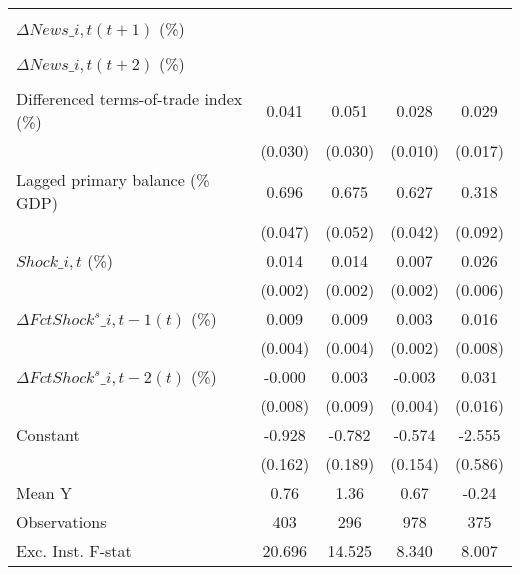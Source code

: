 {\begin{tabular}{l*{4}{c}}
                    &                     &                     &                     &                     \\
\addlinespace
$ \Delta News\_{i,t}(t+1)$ (\%)&                     &                     &                     &                     \\
                    &                     &                     &                     &                     \\
\addlinespace
$ \Delta News\_{i,t}(t+2)$ (\%)&                     &                     &                     &                     \\
                    &                     &                     &                     &                     \\
\addlinespace
Differenced terms-of-trade index (\%)&       0.041         &       0.051         &       0.028\sym{***}&       0.029\sym{*}  \\
                    &     (0.030)         &     (0.030)         &     (0.010)         &     (0.017)         \\
\addlinespace
Lagged primary balance (\% GDP)&       0.696\sym{***}&       0.675\sym{***}&       0.627\sym{***}&       0.318\sym{***}\\
                    &     (0.047)         &     (0.052)         &     (0.042)         &     (0.092)         \\
\addlinespace
$ Shock\_{i,t}$ (\%) &       0.014\sym{***}&       0.014\sym{***}&       0.007\sym{***}&       0.026\sym{***}\\
                    &     (0.002)         &     (0.002)         &     (0.002)         &     (0.006)         \\
\addlinespace
$ \Delta FctShock^s\_{i,t-1}(t)$ (\%)&       0.009\sym{**} &       0.009\sym{*}  &       0.003         &       0.016\sym{**} \\
                    &     (0.004)         &     (0.004)         &     (0.002)         &     (0.008)         \\
\addlinespace
$ \Delta FctShock^s\_{i,t-2}(t)$ (\%)&      -0.000         &       0.003         &      -0.003         &       0.031\sym{*}  \\
                    &     (0.008)         &     (0.009)         &     (0.004)         &     (0.016)         \\
\addlinespace
Constant            &      -0.928\sym{***}&      -0.782\sym{***}&      -0.574\sym{***}&      -2.555\sym{***}\\
                    &     (0.162)         &     (0.189)         &     (0.154)         &     (0.586)         \\
\midrule
Mean Y              &        0.76         &        1.36         &        0.67         &       -0.24         \\
Observations        &         403         &         296         &         978         &         375         \\
Exc. Inst. F-stat   &      20.696         &      14.525         &       8.340         &       8.007         \\
\bottomrule
\end{tabular}
}
